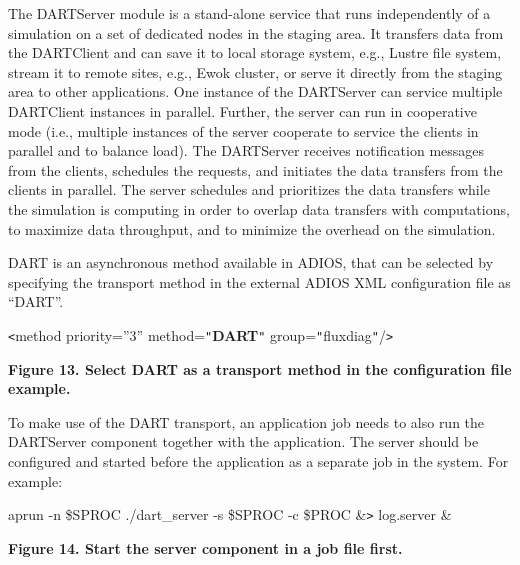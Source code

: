 The DARTServer module is a stand-alone service that runs independently of a simulation 
on a set of dedicated nodes in the staging area. It transfers data from the DARTClient 
and can save it to local storage system, e.g., Lustre file system, stream it to 
remote sites, e.g., Ewok cluster, or serve it directly from the staging area to 
other applications. One instance of the DARTServer can service multiple DARTClient 
instances in parallel. Further, the server can run in cooperative mode (i.e., multiple 
instances of the server cooperate to service the clients in parallel and to balance 
load). The DARTServer receives notification messages from the clients, schedules 
the requests, and initiates the data transfers from the clients in parallel. The 
server schedules and prioritizes the data transfers while the simulation is computing 
in order to overlap data transfers with computations, to maximize data throughput, 
and to minimize the overhead on the simulation.

DART is an asynchronous method available in ADIOS, that can be selected by specifying 
the transport method in the external ADIOS XML configuration file as ``DART''.


\leftskip=18pt
\texttt{<}method priority=''3'' method=\texttt{"}\textbf{DART}\texttt{"} group=\texttt{"}fluxdiag\texttt{"}/\texttt{>}

\label{HToc144350172}

{\color{color20} \textbf{Figure 13. Select DART as a transport method in the configuration 
file example.}}

\leftskip=0pt
To make use of the DART transport, an application job needs to also run the DARTServer 
component together with the application. The server should be configured and started 
before the application as a separate job in the system. For example:

\leftskip=18pt
aprun  -n  \$SPROC ./dart\_server -s \$SPROC -c \$PROC \&\texttt{>} log.server 
\&

\label{HToc144350173}

{\color{color20} \textbf{Figure 14. Start the server component in a job file first.}}

